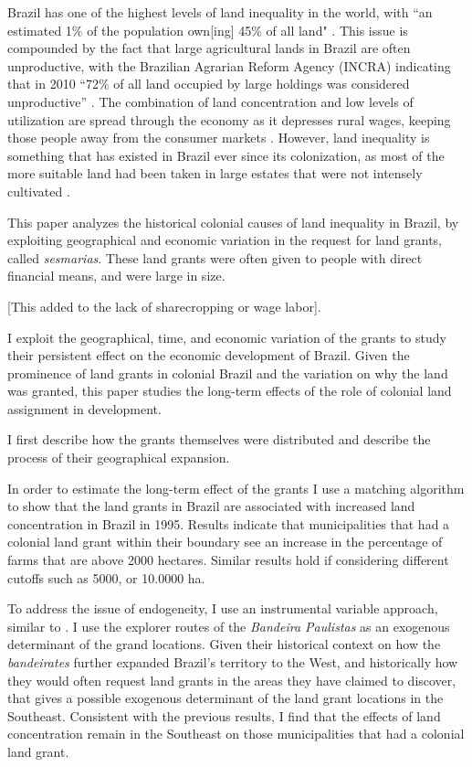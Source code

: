 \documentclass{article}
\begin{document}
Brazil has one of the highest levels of land inequality in the world, with ``an estimated 1\% of the population own[ing] 45\% of all land" \parencite{Usaid2016-xs}. 
This issue is compounded by the fact that large agricultural lands in Brazil are often unproductive, with the Brazilian Agrarian Reform Agency (INCRA) indicating that in 2010 ``72\% of all land occupied by large holdings was considered unproductive'' \parencite{Carlson2019-mk}.
The combination of land concentration and low levels of utilization are spread through the economy as it depresses rural wages, keeping those people away from the consumer markets \parencite[p.~1]{De_Oliveira_Andrade1980-xz}.
However, land inequality is something that has existed in Brazil ever since its colonization, as most of the more suitable land had been taken in large estates that were not intensely cultivated \parencite[p.~53]{Mueller1995-gi}. 

This paper analyzes the historical colonial causes of land inequality in Brazil, by exploiting geographical and economic variation in the request for land grants, called \textit{sesmarias}. 
These land grants were often given to people with direct financial means, and were large in size. 

[This added to the lack of sharecropping or wage labor].

I exploit the geographical, time, and economic variation of the grants to study their persistent effect on the economic development of Brazil.  
Given the prominence of land grants in colonial Brazil and the variation on why the land was granted, this paper studies the long-term effects of the role of colonial land assignment in development.  

I first describe how the grants themselves were distributed and describe the process of their geographical expansion.

In order to estimate the long-term effect of the grants I use a matching algorithm to show that the land grants in Brazil are associated with increased land concentration in Brazil in 1995. 
Results indicate that municipalities that had a colonial land grant within their boundary see an increase in the percentage of farms that are above 2000 hectares. Similar results hold if considering different cutoffs such as 5000, or 10.0000 ha. 

To address the issue of endogeneity, I use an instrumental variable approach, similar to \textcite{Duranton2011-rv}. 
I use the explorer routes of the \textit{Bandeira Paulistas} as an exogenous determinant of the grand locations. 
Given their historical context on how the \textit{bandeirates} further expanded Brazil's territory to the West, and historically how they would often request land grants in the areas they have claimed to discover, that gives a possible exogenous determinant of the land grant locations in the Southeast. 
Consistent with the previous results, I find that the effects of land concentration remain in the Southeast on those municipalities that had a colonial land grant. 
\end{document}
